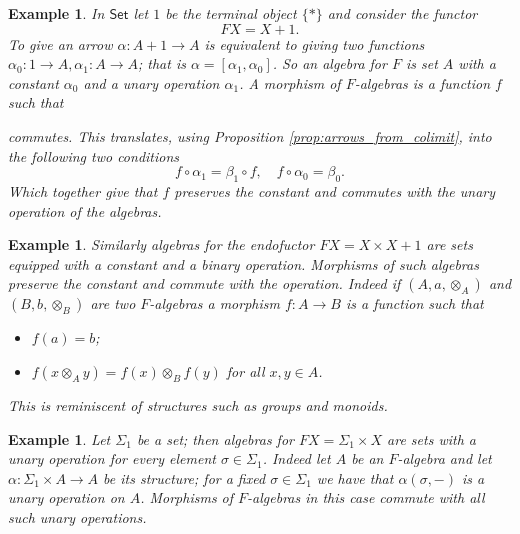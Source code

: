 \documentclass[letterpaper, 11pt, oneside]{memoir}
\theoremstyle{myteo}
\newtheorem{example}[theorem]{Example}
\numberwithin{equation}{section}
\newcommand{\id}{\textsf{id}}
\newcommand{\Set}{\textsf{Set}}
\newcommand{\outofcoprod}[2]{{[#1, #2]}}
\begin{document}
\begin{example}
  \label{ex:prepoly1}
  In \(\Set\) let \(1\) be the terminal object \(\{*\}\) and consider the functor
  \begin{equation*}
    FX = X + 1.
  \end{equation*}
  To give an arrow \(\alpha \colon A + 1 \to A\) is equivalent to giving two functions \(\alpha_0 \colon 1 \to A, \alpha_1 \colon A \to A\); that is \(\alpha = [\alpha_1, \alpha_0]\).
  So an algebra for \(F\) is set \(A\) with a constant \(\alpha_0\) and a unary operation \(\alpha_1\).
  A morphism of \(F\)-algebras is a function \(f\) such that
  \begin{center}
  \end{center}
  commutes.
  This translates, using Proposition \ref{prop:arrows_from_colimit}, into the following two conditions
  \[f \circ \alpha_1 = \beta_1 \circ f, \quad f \circ \alpha_0 = \beta_0.\]
  Which together give that \(f\) preserves the constant and commutes with the unary operation of the algebras.
\end{example}

\begin{example}
  \label{ex:prepoly2}
  Similarly algebras for the endofuctor \(FX = X \times X + 1\) are sets equipped with a constant and a binary operation.
  Morphisms of such algebras preserve the constant and commute with the operation.
  Indeed if \((A, a, \otimes_A)\) and \((B, b, \otimes_B)\) are two \(F\)-algebras a morphism \(f \colon A \to B\) is a function such that
  \begin{itemize}
  \item[1.] \(f(a) = b\);
  \item[2.] \(f(x \otimes_A y) = f(x) \otimes_B f(y)\) for all \(x, y \in A\).
  \end{itemize}
  This is reminiscent of structures such as groups and monoids.
\end{example}

\begin{example}
  \label{ex:prepoly3}
  Let \(\Sigma_1\) be a set; then algebras for \(FX = \Sigma_1 \times X\) are sets with a unary operation for every element \(\sigma \in \Sigma_1\).
  Indeed let \(A\) be an \(F\)-algebra and let \(\alpha \colon \Sigma_1 \times A \to A\) be its structure; for a fixed \(\sigma \in \Sigma_1\) we have that \(\alpha(\sigma, -)\) is a unary operation on \(A\).
  Morphisms of \(F\)-algebras in this case commute with all such unary operations.
\end{example}
\end{document}
